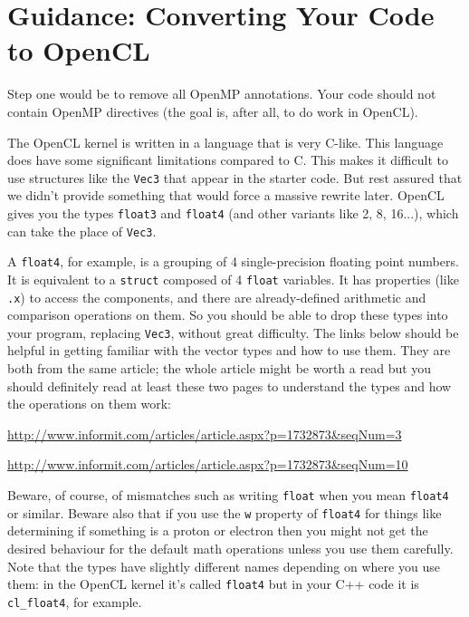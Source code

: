 \documentclass[letterpaper,10pt]{article}
\begin{document}
\section*{Guidance: Converting Your Code to OpenCL}

Step one would be to remove all OpenMP annotations. Your code should not contain
OpenMP directives (the goal is, after all, to do work in OpenCL).

The OpenCL kernel is written in a language that is very C-like. This language does have some
significant limitations compared to C. This makes it difficult to use 
structures like the \texttt{Vec3} that appear in the starter code. But rest 
assured that we didn't provide something that would force a massive 
rewrite later. OpenCL gives you the types \texttt{float3} and \texttt{float4} (and other variants like 2, 8, 16...), which can take the place of \texttt{Vec3}.

A \texttt{float4}, for example, is a grouping of 4 single-precision floating point numbers. It is
equivalent to a \texttt{struct} composed of 4 \texttt{float} variables. It has
properties (like \texttt{.x}) to access the components, and there are
already-defined arithmetic and comparison operations on them. So you should be able to drop
these types into your program, replacing \texttt{Vec3}, without great difficulty.
The links below should be helpful in getting familiar with the vector types and how 
to use them. They are both from the same article; the whole article might be worth a 
read but you should definitely read at least these two pages to understand the 
types and how the operations on them work:

\begin{center}

\url{http://www.informit.com/articles/article.aspx?p=1732873&seqNum=3}

\url{http://www.informit.com/articles/article.aspx?p=1732873&seqNum=10}

\end{center}

Beware, of course, of mismatches such as writing \texttt{float} when you mean 
\texttt{float4} or similar. Beware also that if you use the \texttt{w} property 
of \texttt{float4} for things like determining if something is a proton or electron 
then you might not get the desired behaviour for the default math operations unless
you use them carefully. 
Note that the types have slightly different names 
depending on where you use them: in the OpenCL kernel it's called
\texttt{float4} but in your C++ code it is \texttt{cl\_float4}, for example. 
\end{document}
